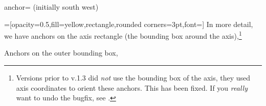 \begin{pgfplotskey}{anchor= (initially south west)}
    {%
    \plottable
    \def\plot{%
        \begin{axis}[
            width=5cm,
            name=test plot,
            xlabel=$x$,
            ylabel={$y$},%
            legend pos=outer north east,
            title=A test plot.,
        ]
            \addplot table from{\plottable};
            \addlegendentry{$f(x)$}
            \addplot [red] plot [id=gnuplot_ppp,domain=-40:40,samples=120] gnuplot{10000*sin(x/3)};
            \addlegendentry{$g(x)$}
        \end{axis}
    }%
    \def\showit#1#2{%
        \node[pin=#2:(s.#1),fill=black,circle,scale=0.3] at (test plot.#1) {};
    }%
    =[opacity=0.5,fill=yellow,rectangle,rounded corners=3pt,font=\tiny]%
    In more detail, we have anchors on the axis rectangle (the bounding box
    around the axis),\footnote{Versions prior to \PGFPlots{} v.1.3 did
    \emph{not} use the bounding box of the axis, they used axis coordinates to
    orient these anchors. This has been fixed. If you \emph{really} want to
    undo the bugfix, see
    \texttt{\protect{}}.}
        \begin{center}
        \end{center}
    Anchors on the outer bounding box,
        \begin{center}
\end{center}}
\end{pgfplotskey}
